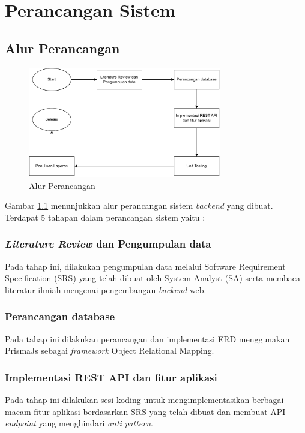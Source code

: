 \chapter{Perancangan Sistem}

\section{Alur Perancangan}
\begin{figure}[h]
	\centering
	\includegraphics[width=0.75\textwidth]{drawio/alur-perancangan.drawio.pdf}
	\caption{Alur Perancangan}
	\label{alur-perancangan}
\end{figure}
Gambar \ref{alur-perancangan} menunjukkan alur perancangan sistem \textit{backend} yang dibuat. Terdapat 5 tahapan dalam perancangan sistem yaitu :

\subsection{\textit{Literature Review} dan Pengumpulan data}
Pada tahap ini, dilakukan pengumpulan data melalui Software Requirement Specification (SRS) yang telah dibuat oleh System Analyst (SA) serta membaca literatur ilmiah mengenai pengembangan \textit{backend} web.

\subsection{Perancangan database}
Pada tahap ini dilakukan perancangan dan implementasi ERD menggunakan PrismaJs sebagai \textit{framework} Object Relational Mapping.

\subsection{Implementasi REST API dan fitur aplikasi}
Pada tahap ini dilakukan sesi koding untuk mengimplementasikan berbagai macam fitur aplikasi berdasarkan SRS yang telah dibuat dan membuat API \textit{endpoint} yang menghindari \textit{anti pattern}.

